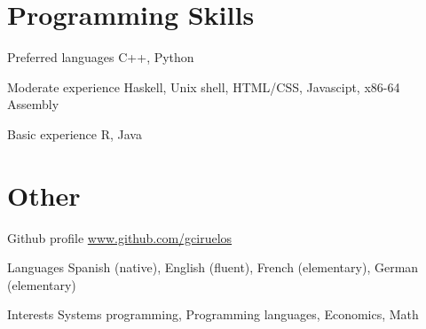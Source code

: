 \documentclass[a4paper,english,10pt]{article}
\begin{document}
\section{Programming Skills}
\begin{CV}
\item[Preferred languages] \hspace{1.2em} C++, Python
\item[Moderate experience] \hspace{0.7em} Haskell, Unix shell, HTML/CSS, Javascipt, x86-64 Assembly
\item[Basic experience]  \hspace{2.4em} R, Java
\end{CV}


\section{Other}
\begin{CV}
\item[Github profile] \href{http://www.github.com/gciruelos}{www.github.com/gciruelos}
\item[Languages] Spanish (native), English (fluent), French (elementary), German (elementary)
\item[Interests] Systems programming, Programming languages, Economics, Math
\end{CV}
\end{document}
